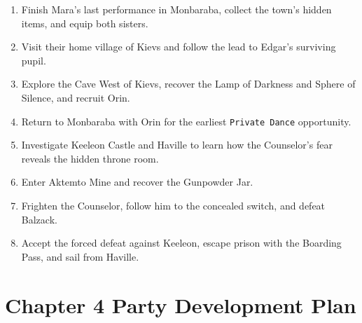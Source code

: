 \documentclass[
  american,
  10pt,
  letterpaper,
  oneside,
  open=any]{scrreprt}
\providecommand{\tightlist}{%
  \setlength{\itemsep}{0pt}\setlength{\parskip}{0pt}}
\begin{document}
\begin{enumerate}
\def\labelenumi{\arabic{enumi}.}
\tightlist
\item
  Finish Mara's last performance in Monbaraba, collect the town's hidden
  items, and equip both sisters.
\item
  Visit their home village of Kievs and follow the lead to Edgar's
  surviving pupil.
\item
  Explore the Cave West of Kievs, recover the Lamp of Darkness and
  Sphere of Silence, and recruit Orin.
\item
  Return to Monbaraba with Orin for the earliest \texttt{Private\ Dance}
  opportunity.
\item
  Investigate Keeleon Castle and Haville to learn how the Counselor's
  fear reveals the hidden throne room.
\item
  Enter Aktemto Mine and recover the Gunpowder Jar.
\item
  Frighten the Counselor, follow him to the concealed switch, and defeat
  Balzack.
\item
  Accept the forced defeat against Keeleon, escape prison with the
  Boarding Pass, and sail from Haville.
\end{enumerate}

\section{Chapter 4 Party Development
Plan}\label{chapter-4-party-development-plan}
\end{document}
